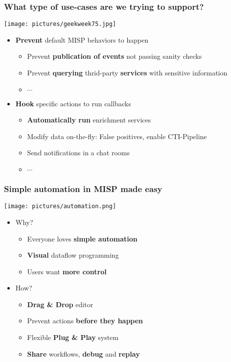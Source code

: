 \begin{frame}
    \frametitle{What type of use-cases are we trying to support?}
    \vspace{-1em}
    \begin{center}
        \texttt{[image: pictures/geekweek75.jpg]}
    \end{center}
    \begin{itemize}
        \item \textbf{Prevent} default MISP behaviors to happen
        \begin{itemize}
            \item Prevent \textbf{publication of events} not passing sanity checks
            \item Prevent \textbf{querying} thrid-party \textbf{services} with sensitive information
            \item $\cdots$
        \end{itemize}
        \vspace*{1.0em}
        \item \textbf{Hook} specific actions to run callbacks
        \begin{itemize}
            \item \textbf{Automatically run} enrichment services
            \item Modify data on-the-fly: False positives, enable CTI-Pipeline
            \item Send notifications in a chat rooms
            \item $\cdots$
        \end{itemize}
    \end{itemize}
\end{frame}

\begin{frame}
    \frametitle{Simple automation in MISP made easy}
    \begin{center}
        \texttt{[image: pictures/automation.png]}
    \end{center}
    \begin{itemize}
        \item Why?
        \begin{itemize}
            \item Everyone loves \textbf{simple automation}
            \item \textbf{Visual} dataflow programming
            \item Users want \textbf{more control}
        \end{itemize}
        \item How?
        \begin{itemize}
            \item \textbf{Drag \& Drop} editor
            \item Prevent actions \textbf{before they happen}
            \item Flexible \textbf{Plug \& Play} system
            \item \textbf{Share} workflows, \textbf{debug} and \textbf{replay}
        \end{itemize}
    \end{itemize}
\end{frame}

